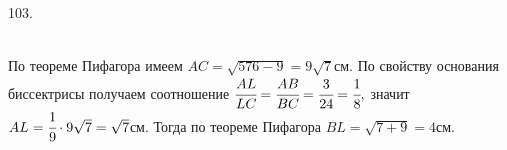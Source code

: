 103. \begin{figure}[ht!]
\end{figure}\\
По теореме Пифагора имеем $AC=\sqrt{576-9}=9\sqrt{7}$см. По свойству основания биссектрисы получаем соотношение $\cfrac{AL}{LC}=\cfrac{AB}{BC}=\cfrac{3}{24}=\cfrac{1}{8},$ значит $AL=\cfrac{1}{9}\cdot9\sqrt{7}=\sqrt{7}$см. Тогда  по теореме Пифагора $BL=\sqrt{7+9}=4$см.\\
